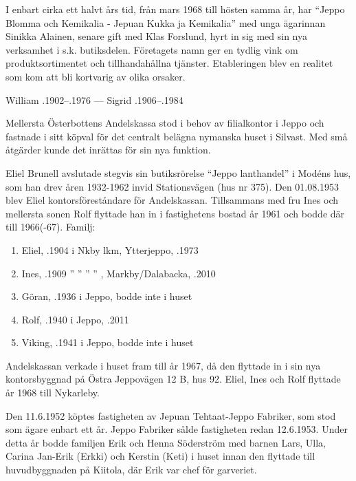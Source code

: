 I enbart cirka ett halvt års tid, från mars 1968 till hösten samma år, har ``Jeppo Blomma och Kemikalia - Jepuan Kukka ja Kemikalia'' med unga ägarinnan Sinikka Alainen, senare gift med Klas Forslund, hyrt in sig med sin nya verksamhet i s.k. butiksdelen. Företagets namn ger en tydlig vink om produktsortimentet och tillhandahållna tjänster. Etableringen blev en realitet som kom att bli kortvarig av olika orsaker.

William .1902--.1976   ---   Sigrid .1906--.1984


%
Mellersta Österbottens Andelskassa stod i behov av filialkontor i Jeppo och fastnade i sitt köpval för det centralt belägna nymanska huset i Silvast. Med små åtgärder kunde det inrättas för sin nya funktion.

Eliel Brunell avslutade stegvis sin butiksrörelse ``Jeppo lanthandel'' i 	Modéns hus, som han drev åren 1932-1962 invid Stationsvägen (hus nr 375). Den 01.08.1953 blev Eliel kontorsföreståndare för Andelskassan. Tillsammans med fru Ines och mellersta sonen Rolf flyttade han in i fastighetens bostad år 1961 och bodde där till 1966(-67).
Familj:
\begin{enumerate}
  \item Eliel, .1904 i Nkby lkm, Ytterjeppo, .1973
  \item Ines, .1909 	'' ''   ''    ''   , Markby/Dalabacka, .2010
  \item Göran, .1936 i Jeppo, bodde inte i huset
  \item Rolf, .1940 i Jeppo, .2011
  \item Viking, .1941  i Jeppo, bodde inte i huset
\end{enumerate}
Andelskassan verkade i huset fram till år 1967, då den flyttade in i sin nya kontorsbyggnad på Östra Jeppovägen 12 B, hus 92. Eliel, Ines och Rolf flyttade år 1968 till Nykarleby.


%
Den 11.6.1952 köptes fastigheten av Jepuan Tehtaat-Jeppo Fabriker, som stod som ägare enbart ett år. Jeppo Fabriker sålde fastigheten redan 12.6.1953. Under detta år bodde familjen Erik och Henna Söderström med barnen Lars, Ulla, Carina Jan-Erik (Erkki) och Kerstin (Keti) i huset innan den flyttade till huvudbyggnaden på Kiitola, där Erik var chef för garveriet.


